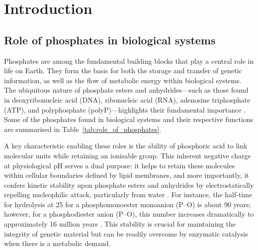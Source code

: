 \chapter{Introduction}

\section{Role of phosphates in biological systems}
Phosphates are among the fundamental building blocks that play a central role in life on Earth. They form the basis for both the storage and transfer of genetic information, as well as the flow of metabolic energy within biological systems. The ubiquitous nature of phosphate esters and anhydrides—such as those found in deoxyribonucleic acid (DNA), ribonucleic acid (RNA), adenosine triphosphate (ATP), and polyphosphate (polyP)—highlights their fundamental importance \citep{westheimerWhyNatureChose1987}. Some of the phosphates found in biological systems and their respective functions are summarised in Table~\ref{tab:role_of_phosphates}.

A key characteristic enabling these roles is the ability of phosphoric acid to link molecular units while retaining an ionisable group. This inherent negative charge at physiological pH serves a dual purpose: it helps to retain these molecules within cellular boundaries defined by lipid membranes, and more importantly, it confers kinetic stability upon phosphate esters and anhydrides by electrostatically repelling nucleophilic attack, particularly from water \citep{westheimerWhyNatureChose1987}. For instance, the half-time for hydrolysis at 25 for a phosphomonoester monoanion (P–O) is about 90 years; however, for a phosphodiester anion (P–O), this number increases dramatically to approximately 16 million years \citep{wolfendenDegreesDifficultyWaterConsuming2006}. This stability is crucial for maintaining the integrity of genetic material but can be readily overcome by enzymatic catalysis when there is a metabolic demand.

